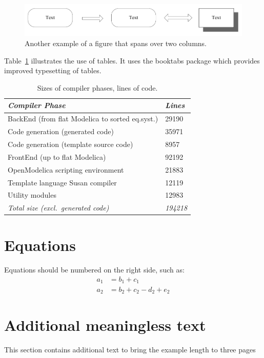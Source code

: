 \documentclass{modelica}
\begin{document}
\begin{figure}[t]
\centering
\includegraphics[width=0.9 \textwidth]{resources/figure2}
\caption{Another example of a figure that spans over two columns.}
\label{fig:figure2}
\end{figure}

Table~\ref{tab:extab} illustrates the use of tables. It uses the
booktabs package which provides improved typesetting of tables.
\begin{table}[htbp]
  \caption{Sizes of compiler phases, lines of code.}\label{tab:extab}
  \centering
  \begin{tabular}{p{6cm}l} \toprule
      \emph{Compiler Phase} & \emph{Lines} \\
      \midrule
      BackEnd (from flat Modelica to sorted eq.syst.) & 29190 \\
      Code generation (generated code) & 35971 \\
      Code generation (template source code) & 8957 \\
      FrontEnd (up to flat Modelica) & 92192 \\
      OpenModelica scripting environment & 21883 \\
      Template language Susan compiler & 12119 \\
      Utility modules & 12983 \\
      \emph{Total size (excl.\ generated code)} & \emph{194218} \\
      \bottomrule
  \end{tabular}
\end{table}

\section{Equations}
Equations should be numbered on the right side, such as:
\begin{align}
a_1& =b_1+c_1\\
a_2& =b_2+c_2-d_2+e_2
\end{align}

\section{Additional meaningless text}
This section contains additional text to bring the example length to three pages
\end{document}
